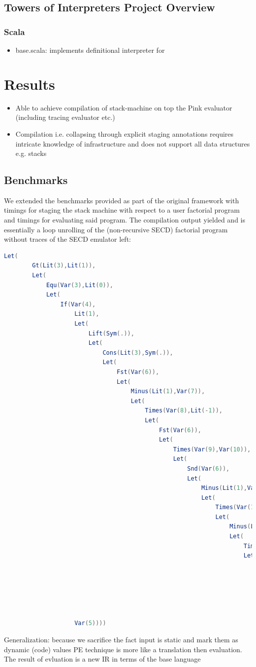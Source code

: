 \documentclass[fleqn]{article}
\theoremstyle{definition}
\begin{document}
\subsection{Towers of Interpreters Project Overview}
\subsubsection{Scala}
\begin{itemize}
	\item base.scala: implements definitional interpreter for \mslang
\end{itemize}

\section{Results}
\begin{itemize}
	\item Able to achieve compilation of stack-machine on top the Pink evaluator (including tracing evaluator etc.)
	\item Compilation i.e. collapsing through explicit staging annotations requires intricate knowledge of infrastructure and does not support all data structures e.g. stacks
\end{itemize}

\subsection{Benchmarks}
We extended the benchmarks provided as part of the original framework \cite{amin2017collapsing} with timings for staging the stack machine with respect to a user factorial program and timings for evaluating said program.
The compilation output yielded and is essentially a loop unrolling of the (non-recursive SECD) factorial program without traces of the SECD emulator left:
\begin{lstlisting}[language=Scala]
	Let(
		Gt(Lit(3),Lit(1)),
		Let(
			Equ(Var(3),Lit(0)),
			Let(
				If(Var(4),
					Lit(1),
					Let(
						Lift(Sym(.)),
						Let(
							Cons(Lit(3),Sym(.)),
							Let(
								Fst(Var(6)),
								Let(
									Minus(Lit(1),Var(7)),
									Let(
										Times(Var(8),Lit(-1)),
										Let(
											Fst(Var(6)),
											Let(
												Times(Var(9),Var(10)),
												Let(
													Snd(Var(6)),
													Let(
														Minus(Lit(1),Var(7)),
														Let(
															Times(Var(13),Lit(-1)),
															Let(
																Minus(Lit(1),Var(14)),
																Let(
																	Times(Var(15),Lit(-1)),
																	Let(
																		Times(Var(16),Var(11)),
																		Let(
																			Minus(Lit(1),Var(14)),
																			Let(
																				Times(Var(18),Lit(-1)),
																				Var(17))))))))))))))))),
					Var(5))))
\end{lstlisting}
Generalization: because we sacrifice the fact input is static and mark them as dynamic (code) values
PE technique is more like a translation then evaluation. The result of evluation is a new IR in terms of the base language
\end{document}
